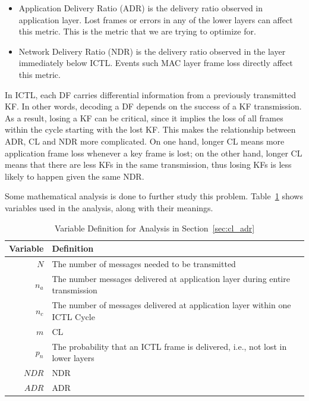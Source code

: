 \documentclass[12pt]{report}
\begin{document}
\begin{itemize}
  \item Application Delivery Ratio (ADR) is the delivery ratio observed in application layer. Lost frames or errors in any of the lower layers can affect this metric. This is the metric that we are trying to optimize for.
  \item Network Delivery Ratio (NDR) is the delivery ratio observed in the layer immediately below ICTL. Events such MAC layer frame loss directly affect this metric.
\end{itemize}

In ICTL, each DF carries differential information from a previously transmitted KF. In other words, decoding a DF depends on the success of a KF transmission. As a result, losing a KF can be critical, since it implies the loss of all frames within the cycle starting with the lost KF. This makes the relationship between ADR, CL and NDR more complicated. On one hand, longer CL means more application frame loss whenever a key frame is lost; on the other hand, longer CL means that there are less KFs in the same transmission, thus losing KFs is less likely to happen given the same NDR.

Some mathematical analysis is done to further study this problem. Table~\ref{tab:cl_var} shows variables used in the analysis, along with their meanings.

\begin{table}
  \begin{center}
    \begin{tabular}{r l}
      \hline
      Variable & Definition \\ \hline
      $N$      & The number of messages needed to be transmitted \\
      $n_a$    & The number messages delivered at application layer during entire transmission \\
      $n_c$ & The number of messages delivered at application layer within one ICTL Cycle \\ 
      $m$      & CL \\
      $p_n$    & The probability that an ICTL frame is delivered, i.e., not lost in lower layers \\
      $NDR$    & NDR \\
      $ADR$    & ADR \\
      \hline
    \end{tabular}
    \caption{\label{tab:cl_var}Variable Definition for Analysis in Section~\ref{sec:cl_adr}}
  \end{center}
\end{table}
\end{document}
